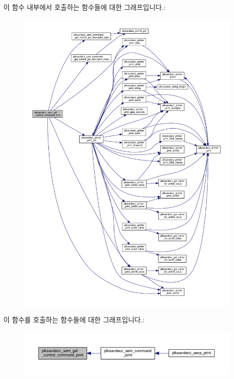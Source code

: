이 함수 내부에서 호출하는 함수들에 대한 그래프입니다.\+:
\nopagebreak
\begin{figure}[H]
\begin{center}
\leavevmode
\includegraphics[width=350pt]{group__aem__print_ga1fd77391f3d8ceb280957198d3512435_cgraph}
\end{center}
\end{figure}




이 함수를 호출하는 함수들에 대한 그래프입니다.\+:
\nopagebreak
\begin{figure}[H]
\begin{center}
\leavevmode
\includegraphics[width=350pt]{group__aem__print_ga1fd77391f3d8ceb280957198d3512435_icgraph}
\end{center}
\end{figure}


